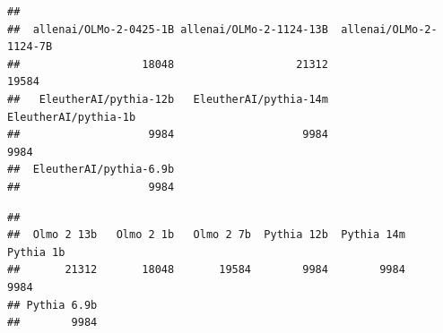 \documentclass[
]{article}
\newenvironment{Shaded}{\begin{snugshade}}{\end{snugshade}}
\newcommand{\FunctionTok}[1]{\textcolor[rgb]{0.13,0.29,0.53}{\textbf{#1}}}
\newcommand{\NormalTok}[1]{#1}
\newcommand{\SpecialCharTok}[1]{\textcolor[rgb]{0.81,0.36,0.00}{\textbf{#1}}}
\begin{document}
\begin{verbatim}
## 
##  allenai/OLMo-2-0425-1B allenai/OLMo-2-1124-13B  allenai/OLMo-2-1124-7B 
##                   18048                   21312                   19584 
##   EleutherAI/pythia-12b   EleutherAI/pythia-14m    EleutherAI/pythia-1b 
##                    9984                    9984                    9984 
##  EleutherAI/pythia-6.9b 
##                    9984
\end{verbatim}

\begin{Shaded}
\end{Shaded}

\begin{verbatim}
## 
##  Olmo 2 13b   Olmo 2 1b   Olmo 2 7b  Pythia 12b  Pythia 14m   Pythia 1b 
##       21312       18048       19584        9984        9984        9984 
## Pythia 6.9b 
##        9984
\end{verbatim}

\begin{Shaded}
\end{Shaded}
\end{document}
